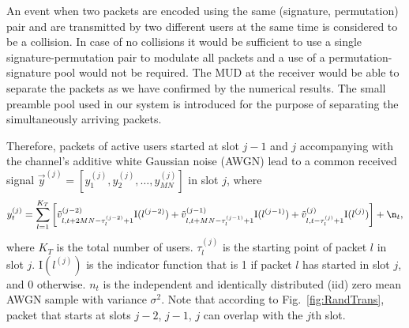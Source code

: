 \documentclass[journal,onecolumn,12pt]{IEEEtran}
\begin{document}
An event when two packets are encoded using the same (signature, permutation) pair and are transmitted by two different users at the same time is considered to be a collision. In case of no collisions it would be sufficient to use a single signature-permutation pair to modulate all packets and a use of a permutation-signature pool would not be required. The MUD at the receiver would be able to separate the packets as we have confirmed by the numerical results. The small preamble pool used in our system is introduced for the purpose of separating the simultaneously arriving packets. 



Therefore, packets of active users started at slot $j-1$ and $j$  accompanying with the channel's additive white Gaussian noise (AWGN) lead to a common received signal $\vec{y}^{(j)}=[y_1^{(j)}, y_2^{(j)}, \dots, y_{MN}^{(j)}]$ in slot $j$, where 
\begin{align}
y_t^{(j)} = \sum_{l=1}^{K_T} \left[\tilde{v}_{l,t+2MN-\tau_l^{(j-2)}+1}^{(j-2)}\text{I}(l^{(j-2)}) + \tilde{v}_{l,t+MN-\tau_l^{(j-1)}+1}^{(j-1)}\text{I}(l^{(j-1)}) + \tilde{v}_{l,t-\tau_l^{(j)}+1}^{(j)}\text{I}(l^{(j)})\right] + \n_t, \label{eq:ytj}
\end{align}
where $K_T$ is the total number of users. $\tau_l^{(j)}$ is the starting point of packet $l$ in slot $j$. $\text{I}(l^{(j)})$ is the indicator function that is 1 if packet $l$ has started in slot $j$, and 0 otherwise. $n_t$ is the independent and identically distributed (iid) zero mean AWGN sample with variance $\sigma^2$. Note that according to Fig.~\ref{fig:RandTrans}, packet that starts at slots $j-2$, $j-1$, $j$ can overlap with the $j$th slot.
\end{document}
